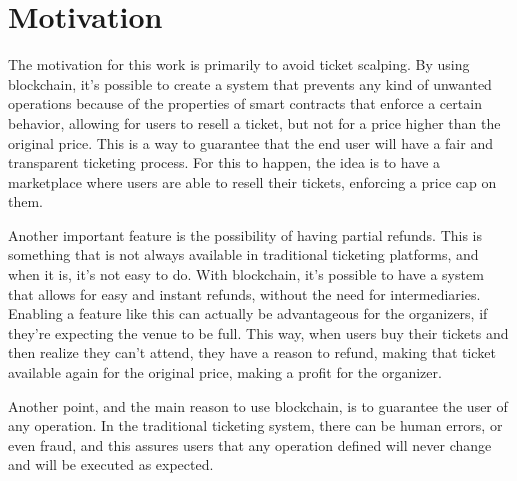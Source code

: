 \section{Motivation}

The motivation for this work is primarily to avoid ticket scalping. By using blockchain, it's possible to create a system that prevents any kind of unwanted operations because of the properties of smart contracts that enforce a certain behavior, allowing for users to resell a ticket, but not for a price higher than the original price. This is a way to guarantee that the end user will have a fair and transparent ticketing process. For this to happen, the idea is to have a marketplace where users are able to resell their tickets, enforcing a price cap on them.

Another important feature is the possibility of having partial refunds. This is something that is not always available in traditional ticketing platforms, and when it is, it's not easy to do. With blockchain, it's possible to have a system that allows for easy and instant refunds, without the need for intermediaries. Enabling a feature like this can actually be advantageous for the organizers, if they're expecting the venue to be full. This way, when users buy their tickets and then realize they can't attend, they have a reason to refund, making that ticket available again for the original price, making a profit for the organizer.

Another point, and the main reason to use blockchain, is to guarantee the user of any operation. In the traditional ticketing system, there can be human errors, or even fraud, and this assures users that any operation defined will never change and will be executed as expected.
